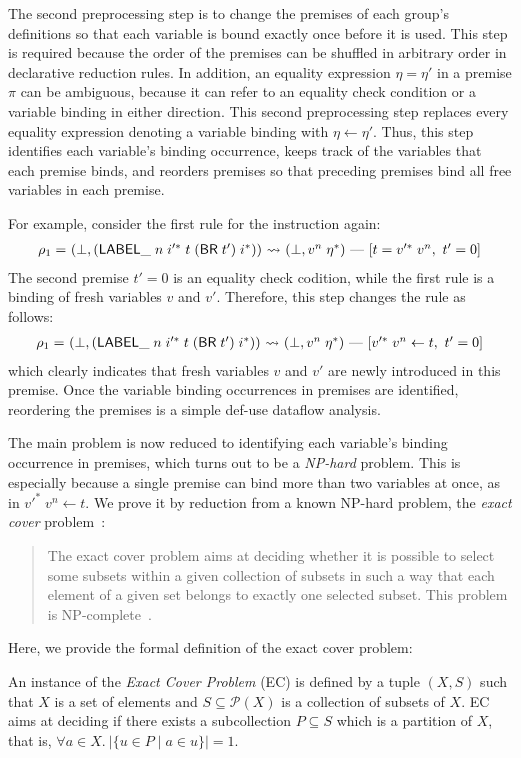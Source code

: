 \medskip
The second preprocessing step is to change the premises of each group's definitions
so that each variable is bound exactly once before it is used.
This step is required because the order of the premises can be
shuffled in arbitrary order in declarative reduction rules.
In addition, an equality expression $\eta = \eta'$ in a premise $\pi$ can be ambiguous,
because it can refer to an equality check condition or a variable binding in either direction.
This second preprocessing step replaces every equality expression denoting a variable binding with $\eta \leftarrow \eta'$.
Thus, this step identifies each variable's binding occurrence,
keeps track of the variables that each premise binds,
and reorders premises so that preceding premises bind all free variables in each premise.

For example, consider the first rule for the  instruction again:
\[
\begin{array}{l@{~}l@{~}c@{~}l}
\rho_1 = &(\bot, (\ssf{LABEL\_} \; n \; i'^*\; t\; (\ssf{BR}\; t')\; i^*)) &\leadsto&
 (\bot, v^n\; \eta^*)\ \mbox{---}\ [t = v'^*\; v^n,\ t' = 0]\\
\end{array}
\]
The second premise $t' = 0$ is an equality check codition,
while the first rule is a binding of fresh variables $v$ and $v'$.
Therefore, this step changes the rule as follows:
\[
\begin{array}{l@{~}l@{~}c@{~}l}
\rho_1 = &(\bot, (\ssf{LABEL\_} \; n \; i'^*\; t\; (\ssf{BR}\; t')\; i^*)) &\leadsto&
 (\bot, v^n\; \eta^*)\ \mbox{---}\ [v'^*\; v^n \leftarrow t,\ t' = 0]\\
\end{array}
\]
which clearly indicates that fresh variables $v$ and $v'$ are newly introduced in this premise.
Once the variable binding occurrences in premises are identified,
reordering the premises is a simple def-use dataflow analysis.

The main problem is now reduced to identifying each variable's binding occurrence in premises,
which turns out to be a \textit{NP-hard} problem.
This is especially because a single premise can bind more than two variables at once,
as in $v'^*\; v^n \leftarrow t$.
We prove it by reduction from a known NP-hard problem, the \textit{exact cover} problem~\cite{exactcover}:
\begin{quote}
The exact cover problem aims at deciding whether it is possible to select some subsets within a given collection of subsets in such a way that each element of a given set belongs to exactly one selected subset. This problem is NP-complete~\cite{karp72}.
\end{quote}
Here, we provide the formal definition of the exact cover problem:
\begin{definition}\label{def:exactcover}
An instance of the \textit{Exact Cover Problem} (EC) is defined by a tuple $(X, S)$
such that $X$ is a set of elements and $S \subseteq \mathcal{P}(X)$ is a collection of subsets of $X$.
EC aims at deciding if there exists a subcollection $P \subseteq S$ which is a partition of $X$,
that is, $\forall a \in X.\ |\{ u \in P \mid a \in u \}| = 1$.
\end{definition}


